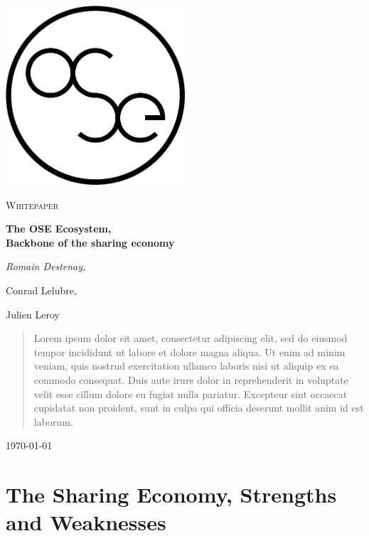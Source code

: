 \documentclass[a4paper]{article}
\begin{document}
\begin{titlepage}
	\centering
	\includegraphics[width=0.5\textwidth]{OSE_logo2.jpg}\par\vspace{0.5cm}
	{\scshape\Huge Whitepaper\par}
	\vspace{1.5cm}
	{\huge\bfseries The OSE Ecosystem,\\ Backbone of the sharing economy\par}
	\vspace{2cm}
	{\Large\itshape Romain Destenay,\par Conrad Lelubre,\par Julien Leroy\par}
	\vspace{2cm}

\begin{abstract}
Lorem ipsum dolor sit amet, consectetur adipiscing elit, sed do eiusmod tempor incididunt ut labore et dolore magna aliqua. Ut enim ad minim veniam, quis nostrud exercitation ullamco laboris nisi ut aliquip ex ea commodo consequat. Duis aute irure dolor in reprehenderit in voluptate velit esse cillum dolore eu fugiat nulla pariatur. Excepteur sint occaecat cupidatat non proident, sunt in culpa qui officia deserunt mollit anim id est laborum.
\end{abstract}


	\vfill

	{\large \today\par}
\end{titlepage}


\setcounter{tocdepth}{2}
\tableofcontents

\newpage

\section{The Sharing Economy, Strengths and Weaknesses}
\end{document}
